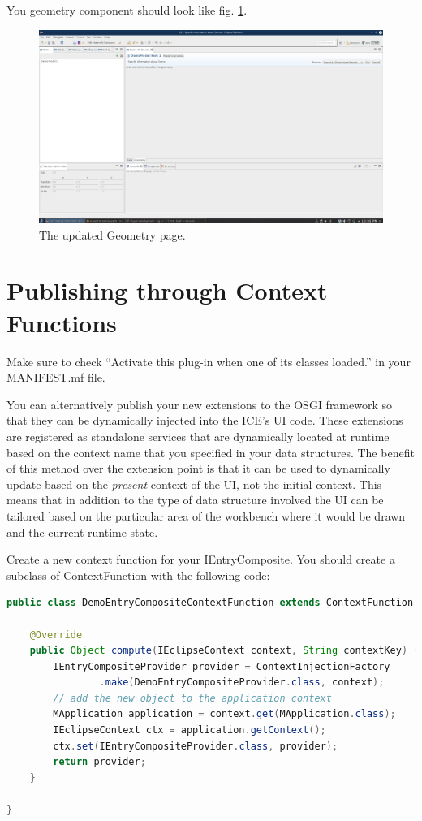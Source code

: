 You geometry component should look like fig. \ref{fig:iceDemoGeometryPage}.

\begin{figure}[h]
\includegraphics[width=\textwidth]{pics/dynamicUI_demoGeometryPage.png}
\caption{The updated Geometry page.}
\label{fig:iceDemoGeometryPage}
\end{figure}

\section{Publishing through Context Functions}

Make sure to check “Activate this plug-in when one of its classes loaded.” in
your MANIFEST.mf file.

You can alternatively publish your new extensions to the OSGI framework so that
they can be dynamically injected into the ICE’s UI code. These extensions are
registered as standalone services that are dynamically located at runtime based
on the context name that you specified in your data structures. The benefit of
this method over the extension point is that it can be used to dynamically
update based on the \textit{present} context of the UI, not the initial
context. This means that in addition to the type of data structure involved the
UI can be tailored based on the particular area of the workbench where it would
be drawn and the current runtime state.

Create a new context function for your IEntryComposite. You should create a
subclass of ContextFunction with the following code:

\begin{lstlisting}[language=java]
public class DemoEntryCompositeContextFunction extends ContextFunction {

    @Override
    public Object compute(IEclipseContext context, String contextKey) {
        IEntryCompositeProvider provider = ContextInjectionFactory
                .make(DemoEntryCompositeProvider.class, context);
        // add the new object to the application context
        MApplication application = context.get(MApplication.class);
        IEclipseContext ctx = application.getContext();
        ctx.set(IEntryCompositeProvider.class, provider);
        return provider;
    }

}
\end{lstlisting}

